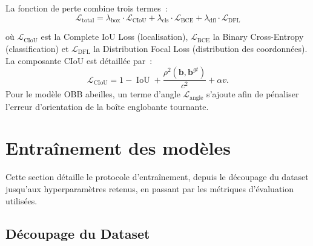 La fonction de perte combine trois termes~:
\begin{equation}
\mathcal{L}_\text{total} = \lambda_\text{box}\cdot\mathcal{L}_\text{CIoU}
  + \lambda_\text{cls}\cdot\mathcal{L}_\text{BCE}
  + \lambda_\text{dfl}\cdot\mathcal{L}_\text{DFL}
\label{eq:yolo11_loss}
\end{equation}

où $\mathcal{L}_\text{CIoU}$ est la Complete IoU Loss (localisation),
$\mathcal{L}_\text{BCE}$ la Binary Cross-Entropy (classification) et
$\mathcal{L}_\text{DFL}$ la Distribution Focal Loss (distribution des coordonnées).
La composante CIoU est détaillée par~:
\begin{equation}
\mathcal{L}_\text{CIoU} = 1 - \operatorname{IoU}
+ \frac{\rho^2(\mathbf{b},\mathbf{b}^{gt})}{c^2} + \alpha v.
\label{eq:ciou}
\end{equation}
Pour le modèle OBB abeilles, un terme d'angle $\mathcal{L}_\text{angle}$ s'ajoute
afin de pénaliser l'erreur d'orientation de la boîte englobante tournante.

\begin{table}[H]
\centering
\caption{Caractéristiques comparées des modèles YOLO déployés dans Smart Farm AI}
\label{tab:yolo11_specs}
\end{table}

\section{Entraînement des modèles}

Cette section détaille le protocole d'entraînement, depuis le découpage du dataset
jusqu'aux hyperparamètres retenus, en passant par les métriques d'évaluation utilisées.

\subsection{Découpage du Dataset}

